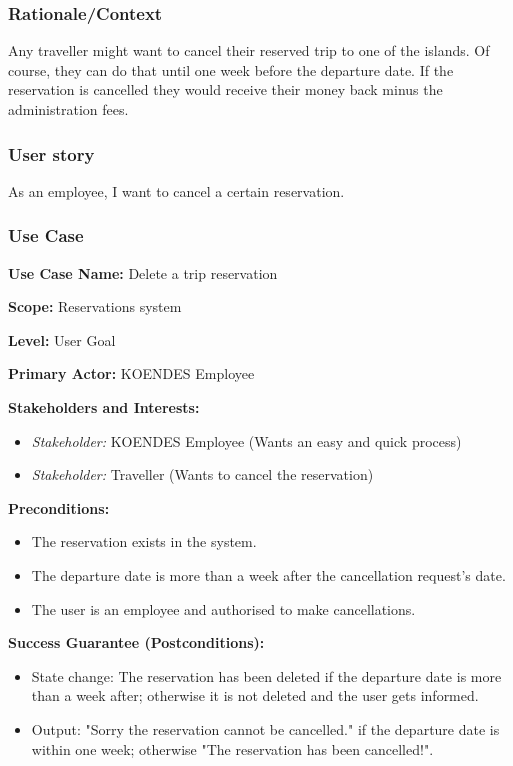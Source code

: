\subsubsection{Rationale/Context}

Any traveller might want to cancel their reserved trip to one of the islands. Of course, they can do that until one week before the departure date. If the reservation is cancelled they would receive their money back minus the administration fees.

\subsubsection{User story}

As an employee, I want to cancel a certain reservation.

\subsubsection{Use Case}
\creator{\studentC}
\updater{\studentA}
\secondUpdater{\studentB}

\textbf{Use Case Name:} Delete a trip reservation

\textbf{Scope:} Reservations system

\textbf{Level:} User Goal

\textbf{Primary Actor:} KOENDES Employee

\textbf{Stakeholders and Interests:} 
\begin{itemize}
\item \textit{Stakeholder:} KOENDES Employee (Wants an easy and quick process)
\item \textit{Stakeholder:} Traveller (Wants to cancel the reservation)
\end{itemize}

\textbf{Preconditions:} 
\begin{itemize}
\item The reservation exists in the system.
\item The departure date is more than a week after the cancellation request's date.
\item The user is an employee and authorised to make cancellations.
\end{itemize}

\textbf{Success Guarantee (Postconditions):}
\begin{itemize}
\item State change: The reservation has been deleted if the departure date is more than a week after; otherwise it is not deleted and the user gets informed.
\item Output: "Sorry the reservation cannot be cancelled." if the departure date is within one week; otherwise "The reservation has been cancelled!".
\end{itemize}

